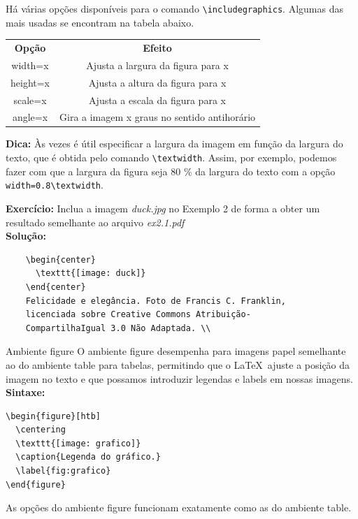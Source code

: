 \documentclass[12pt]{beamer}
\begin{document}
\begin{frame}[fragile]
  Há várias opções disponíveis para o comando \verb+\includegraphics+. Algumas das mais usadas se encontram na tabela abaixo.
  \begin{center}
    \begin{tabular}{cc}
      \textbf{Opção} & \textbf{Efeito} \\
      width=x & Ajusta a largura da figura para x\\
      height=x & Ajusta a altura da figura para x\\
      scale=x & Ajusta a escala da figura para x\\	
      angle=x & Gira a imagem x graus no sentido
      antihorário
    \end{tabular}
  \end{center}
  
  \textbf{Dica: } Às vezes é útil especificar a largura da imagem em função da largura do texto, que é obtida pelo comando \verb+\textwidth+. Assim, por exemplo, podemos fazer com que a largura da figura seja 80 \% da largura do texto com a opção \verb+width=0.8\textwidth+.
\end{frame}

\begin{frame}[fragile]

  \textbf{Exercício: } Inclua a imagem \emph{duck.jpg} no Exemplo 2 de forma a obter um resultado semelhante ao arquivo \emph{ex2.1.pdf}\\
  \bigskip
  \pause
  \textbf{Solução: }
  \begin{verbatim}
    \begin{center}
      \texttt{[image: duck]} 
    \end{center}
    Felicidade e elegância. Foto de Francis C. Franklin, 
    licenciada sobre Creative Commons Atribuição-
    CompartilhaIgual 3.0 Não Adaptada. \\
  \end{verbatim}

\end{frame}

\begin{frame}[fragile]{Ambiente figure}
O ambiente figure desempenha para imagens papel semelhante ao do ambiente table para tabelas, permitindo que o \LaTeX\ ajuste a posição da imagem no texto e que possamos introduzir legendas e labels em nossas imagens.\\

\textbf{Sintaxe: }
\begin{verbatim}
\begin{figure}[htb]
  \centering
  \texttt{[image: grafico]}
  \caption{Legenda do gráfico.}
  \label{fig:grafico}
\end{figure}
\end{verbatim}

As opções do ambiente figure funcionam exatamente como as do ambiente table.
\end{frame}
\end{document}
